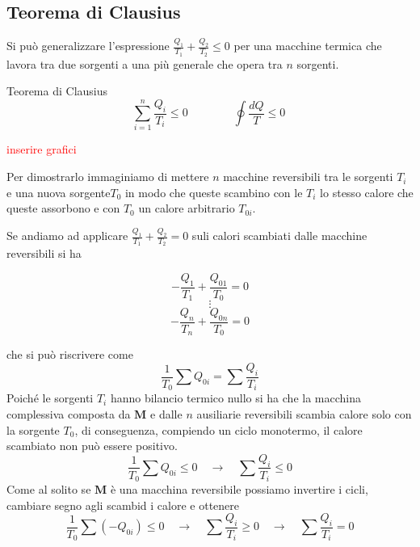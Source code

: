 \documentclass[x11names]{report}
\begin{document}
	\subsection{Teorema di Clausius}
	Si può generalizzare l'espressione \(\frac{Q_{1}}{T_{1}} + \frac{Q_{2}}{T_{2}} \leq 0\) per una macchine termica che lavora tra due sorgenti a una più generale che opera tra \(n\) sorgenti.
	\begin{center}
		\colorbox{yred}{\begin{minipage}{5.75in}
				\begin{redes}{Teorema di Clausius}
					\begin{equation}
						\sum_{i=1}^{n}\frac{Q_{i}}{T_{i}} \leq 0 \qquad \qquad \oint \frac{dQ}{T} \leq 0\
					\end{equation}
				\end{redes}
		\end{minipage}}
	\end{center}
	
	\begin{center}
		\textcolor{red}{inserire grafici}
	\end{center}
	
	Per dimostrarlo immaginiamo di mettere \(n\) macchine reversibili tra le sorgenti \(T_{i}\) e una nuova sorgente\(T_{0}\) in modo che queste scambino con le \(T_{i}\) lo stesso calore che queste assorbono e con \(T_{0}\) un calore arbitrario \(T_{0i}\). 
	
	Se andiamo ad applicare \(	\frac{Q_{1}}{T_{1}} + \frac{Q_{2}}{T_{2}} = 0\) suli calori scambiati dalle macchine reversibili si ha
	
	\[ 
	-\frac{Q_{1}}{T_{1}} + \frac{Q_{01}}{T_{0}}  = 0	
	\]
	\[
	\vdots
	\]
	\[
	-\frac{Q_{n}}{T_{n}} + \frac{Q_{0n}}{T_{0}}  = 0	
	\]
	
	che si può riscrivere come
	\[ 
	\frac{1}{T_{0}}\sum Q_{0i} = \sum \frac{Q_{i}}{T_{i}}
	\]
	Poiché le sorgenti \(T_{i}\) hanno bilancio termico nullo si ha che la macchina complessiva composta da \(\boldsymbol{M}\) e dalle \(n\) ausiliarie reversibili scambia calore solo con la sorgente \(T_{0}\), di conseguenza, compiendo un ciclo monotermo, il calore scambiato non può essere positivo.	
	\[ 
	\frac{1}{T_{0}}\sum Q_{0i}\leq 0 \quad \to \quad \boxed{\sum \frac{Q_{i}}{T_{i}} \leq 0}
	\]
	Come al solito se \(\boldsymbol{M}\) è una macchina reversibile possiamo invertire i cicli, cambiare segno agli scambid i calore e ottenere 
	\[ 
	\frac{1}{T_{0}}\sum (-Q_{0i})\leq 0 \quad \to \quad \boxed{\sum \frac{Q_{i}}{T_{i}} \geq 0}
	\quad \to \quad \sum \frac{Q_{i}}{T_{i}} = 0
	\]
	
\end{document}
